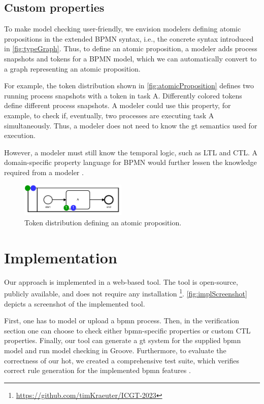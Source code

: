 \documentclass[runningheads]{llncs}
\begin{document}
\subsection{Custom properties} \label{subsec:customProperties}
To make model checking user-friendly, we envision modelers defining atomic propositions in the extended BPMN syntax, i.e., the concrete syntax introduced in \autoref{fig:typeGraph}.
Thus, to define an atomic proposition, a modeler adds process snapshots and tokens for a BPMN model, which we can automatically convert to a graph representing an atomic proposition.

For example, the token distribution shown in \autoref{fig:atomicProposition} defines two running process snapshots with a token in task A.
Differently colored tokens define different process snapshots.
A modeler could use this property, for example, to check if, eventually, two processes are executing task A simultaneously.
Thus, a modeler does not need to know the \gls*{gt} semantics used for execution.

However, a modeler must still know the temporal logic, such as LTL and CTL.
A domain-specific property language for BPMN would further lessen the knowledge required from a modeler \cite{meyersProMoBoxFrameworkGenerating2014}. 


\begin{figure}[ht]
    \centering
    \includegraphics[width=0.45\textwidth]{images/bpmn_semantics-atomic-proposition.pdf}
    \caption{Token distribution defining an atomic proposition.}
    \label{fig:atomicProposition}
\end{figure}


\section{Implementation} \label{sec:impl}

Our approach is implemented in a web-based tool.
The tool is open-source, publicly available, and does not require any installation \cite{krauterArtifactsICGT2023}\footnote{\url{https://github.com/timKraeuter/ICGT-2023}}.
\autoref{fig:implScreenshot} depicts a screenshot of the implemented tool.

First, one has to model or upload a \gls*{bpmn} process.
Then, in the verification section one can choose to check either \gls*{bpmn}-specific properties or custom CTL properties.
Finally, our tool can generate a \gls*{gt} system for the supplied \gls*{bpmn} model and run model checking in Groove.
Furthermore, to evaluate the correctness of our \gls*{hot}, we created a comprehensive test suite, which verifies correct rule generation for the implemented \gls*{bpmn} features \cite{krauterArtifactsICGT2023}.
\end{document}
